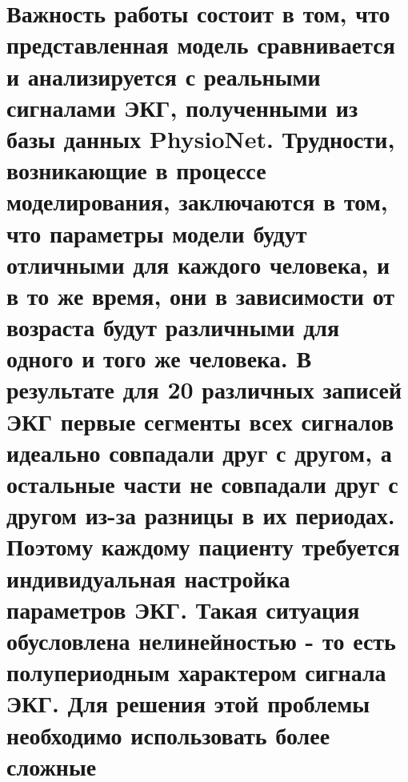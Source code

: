 \documentclass[
]{article}
\begin{document}
\section{Важность работы состоит в том, что представленная модель
сравнивается и анализируется с реальными сигналами ЭКГ, полученными из
базы данных PhysioNet. Трудности, возникающие в процессе моделирования,
заключаются в том, что параметры модели будут отличными для каждого
человека, и в то же время, они в зависимости от возраста будут
различными для одного и того же человека. В результате для 20 различных
записей ЭКГ первые сегменты всех сигналов идеально совпадали друг с
другом, а остальные части не совпадали друг с другом из-за разницы в их
периодах. Поэтому каждому пациенту требуется индивидуальная настройка
параметров ЭКГ. Такая ситуация обусловлена нелинейностью - то есть
полупериодным характером сигнала ЭКГ. Для решения этой проблемы
необходимо использовать более сложные
}
\end{document}
